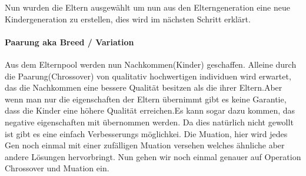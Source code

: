 Nun wurden die Eltern ausgewählt um nun aus den Elterngeneration eine neue Kindergeneration zu erstellen, dies wird im nächsten Schritt erklärt.

\paragraph{Paarung aka Breed / Variation}
Aus dem Elternpool werden nun Nachkommen(Kinder) geschaffen. Alleine durch die Paarung(Chrossover) von qualitativ hochwertigen individuen wird erwartet, das die Nachkommen eine bessere Qualität besitzen als die ihrer Eltern.Aber wenn man nur die eigenschaften der Eltern übernimmt gibt es keine Garantie, dass die Kinder eine höhere Qualität erreichen.Es kann sogar dazu kommen, das negative eigenschaften mit übernommen werden. Da dies natürlich nicht gewollt ist gibt es eine einfach Verbesserungs möglichkei. Die Muation, hier wird jedes Gen noch einmal mit einer zufälligen Muation versehen welches ähnliche aber andere Lösungen hervorbringt. Nun gehen wir noch einmal genauer auf Operation Chrossover und Muation ein.

